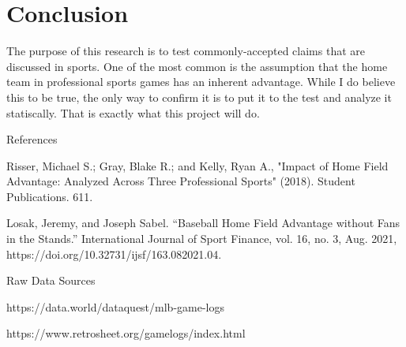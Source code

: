 \documentclass[12pt]{article}
\begin{document}
\section{Conclusion}
The purpose of this research is to test commonly-accepted claims that are discussed in sports. One of the most common is the assumption that the home team in professional sports games has an inherent advantage. While I do believe this to be true, the only way to confirm it is to put it to the test and analyze it statiscally. That is exactly what this project will do.

\pagebreak
\begin{center}
References
\end{center}

Risser, Michael S.; Gray, Blake R.; and Kelly, Ryan A., "Impact of Home Field Advantage: Analyzed Across Three Professional Sports" (2018). Student Publications. 611. \hfill \break

Losak, Jeremy, and Joseph Sabel. “Baseball Home Field Advantage without Fans in the Stands.” International Journal of Sport Finance, vol. 16, no. 3, Aug. 2021, https://doi.org/10.32731/ijsf/163.082021.04. \hfill \break

\begin{center}
Raw Data Sources
\end{center}

https://data.world/dataquest/mlb-game-logs \hfill \break

https://www.retrosheet.org/gamelogs/index.html
\end{document}

